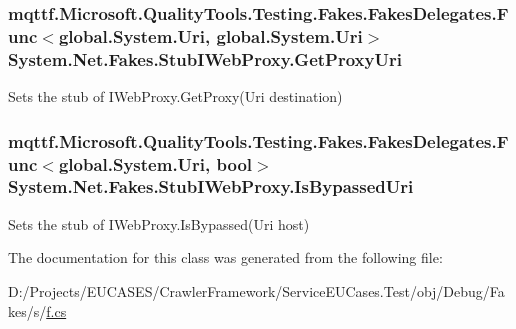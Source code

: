 \hypertarget{class_system_1_1_net_1_1_fakes_1_1_stub_i_web_proxy_a51d2ca19e1bcce1fa092d6a005df2246}{
\subsubsection[{Get\-Proxy\-Uri}]{\setlength{\rightskip}{0pt plus 5cm}mqttf.\-Microsoft.\-Quality\-Tools.\-Testing.\-Fakes.\-Fakes\-Delegates.\-Func$<$global.\-System.\-Uri, global.\-System.\-Uri$>$ System.\-Net.\-Fakes.\-Stub\-I\-Web\-Proxy.\-Get\-Proxy\-Uri}}\label{class_system_1_1_net_1_1_fakes_1_1_stub_i_web_proxy_a51d2ca19e1bcce1fa092d6a005df2246}


Sets the stub of I\-Web\-Proxy.\-Get\-Proxy(\-Uri destination)

\hypertarget{class_system_1_1_net_1_1_fakes_1_1_stub_i_web_proxy_a990275edcb71023413082e7d2325baf3}{
\subsubsection[{Is\-Bypassed\-Uri}]{\setlength{\rightskip}{0pt plus 5cm}mqttf.\-Microsoft.\-Quality\-Tools.\-Testing.\-Fakes.\-Fakes\-Delegates.\-Func$<$global.\-System.\-Uri, bool$>$ System.\-Net.\-Fakes.\-Stub\-I\-Web\-Proxy.\-Is\-Bypassed\-Uri}}\label{class_system_1_1_net_1_1_fakes_1_1_stub_i_web_proxy_a990275edcb71023413082e7d2325baf3}


Sets the stub of I\-Web\-Proxy.\-Is\-Bypassed(\-Uri host)



The documentation for this class was generated from the following file\-:\begin{DoxyCompactItemize}
\item 
D\-:/\-Projects/\-E\-U\-C\-A\-S\-E\-S/\-Crawler\-Framework/\-Service\-E\-U\-Cases.\-Test/obj/\-Debug/\-Fakes/s/\hyperlink{s_2f_8cs}{f.\-cs}\end{DoxyCompactItemize}
